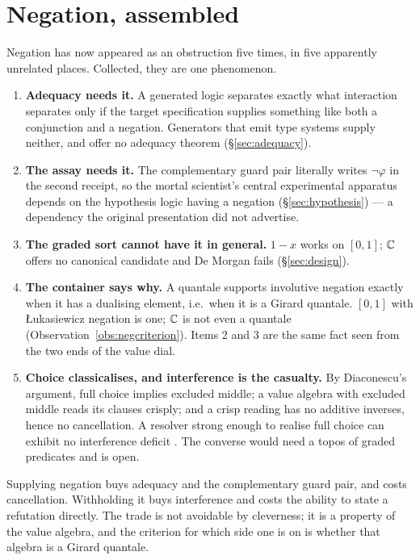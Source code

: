\section{Negation, assembled}
\label{sec:negation}

Negation has now appeared as an obstruction five times, in five apparently
unrelated places. Collected, they are one phenomenon.

\begin{enumerate}[leftmargin=2em]
\item \textbf{Adequacy needs it.} A generated logic separates exactly what
interaction separates only if the target specification supplies something like
both a conjunction and a negation. Generators that emit type systems supply
neither, and offer no adequacy theorem (\S\ref{sec:adequacy}).

\item \textbf{The assay needs it.} The complementary guard pair literally writes
$\lnot\varphi$ in the second receipt, so the mortal scientist's central
experimental apparatus depends on the hypothesis logic having a negation
(\S\ref{sec:hypothesis}) --- a dependency the original presentation did not
advertise.

\item \textbf{The graded sort cannot have it in general.} $1-x$ works on $[0,1]$;
$\mathbb{C}$ offers no canonical candidate and De Morgan fails (\S\ref{sec:design}).

\item \textbf{The container says why.} A quantale supports involutive negation
exactly when it has a dualising element, i.e.\ when it is a Girard quantale.
$[0,1]$ with \L{}ukasiewicz negation is one; $\mathbb{C}$ is not even a quantale
(Observation~\ref{obs:negcriterion}). Items 2 and 3 are the same fact seen from
the two ends of the value dial.

\item \textbf{Choice classicalises, and interference is the casualty.} By
Diaconescu's argument, full choice implies excluded middle; a value algebra with
excluded middle reads its clauses crisply; and a crisp reading has no additive
inverses, hence no cancellation. A resolver strong enough to realise full choice
can exhibit no interference deficit \cite{Diaconescu75,ChoiceFormulae}. The
converse would need a topos of graded predicates and is open.
\end{enumerate}

\begin{principle}
\label{prin:negfault}
Supplying negation buys adequacy and the complementary guard pair, and costs
cancellation. Withholding it buys interference and costs the ability to state a
refutation directly. The trade is not avoidable by cleverness; it is a property of
the value algebra, and the criterion for which side one is on is whether that
algebra is a Girard quantale.
\end{principle}

